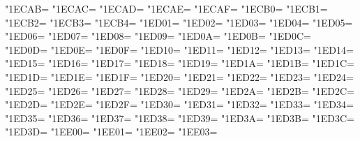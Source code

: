 \XeTeXcharclass"1ECAB=\KclassArabU
\XeTeXcharclass"1ECAC=\KclassArabU
\XeTeXcharclass"1ECAD=\KclassArabU
\XeTeXcharclass"1ECAE=\KclassArabU
\XeTeXcharclass"1ECAF=\KclassArabU
\XeTeXcharclass"1ECB0=\KclassArabU
\XeTeXcharclass"1ECB1=\KclassArabU
\XeTeXcharclass"1ECB2=\KclassArabU
\XeTeXcharclass"1ECB3=\KclassArabU
\XeTeXcharclass"1ECB4=\KclassArabU
\XeTeXcharclass"1ED01=\KclassArabU
\XeTeXcharclass"1ED02=\KclassArabU
\XeTeXcharclass"1ED03=\KclassArabU
\XeTeXcharclass"1ED04=\KclassArabU
\XeTeXcharclass"1ED05=\KclassArabU
\XeTeXcharclass"1ED06=\KclassArabU
\XeTeXcharclass"1ED07=\KclassArabU
\XeTeXcharclass"1ED08=\KclassArabU
\XeTeXcharclass"1ED09=\KclassArabU
\XeTeXcharclass"1ED0A=\KclassArabU
\XeTeXcharclass"1ED0B=\KclassArabU
\XeTeXcharclass"1ED0C=\KclassArabU
\XeTeXcharclass"1ED0D=\KclassArabU
\XeTeXcharclass"1ED0E=\KclassArabU
\XeTeXcharclass"1ED0F=\KclassArabU
\XeTeXcharclass"1ED10=\KclassArabU
\XeTeXcharclass"1ED11=\KclassArabU
\XeTeXcharclass"1ED12=\KclassArabU
\XeTeXcharclass"1ED13=\KclassArabU
\XeTeXcharclass"1ED14=\KclassArabU
\XeTeXcharclass"1ED15=\KclassArabU
\XeTeXcharclass"1ED16=\KclassArabU
\XeTeXcharclass"1ED17=\KclassArabU
\XeTeXcharclass"1ED18=\KclassArabU
\XeTeXcharclass"1ED19=\KclassArabU
\XeTeXcharclass"1ED1A=\KclassArabU
\XeTeXcharclass"1ED1B=\KclassArabU
\XeTeXcharclass"1ED1C=\KclassArabU
\XeTeXcharclass"1ED1D=\KclassArabU
\XeTeXcharclass"1ED1E=\KclassArabU
\XeTeXcharclass"1ED1F=\KclassArabU
\XeTeXcharclass"1ED20=\KclassArabU
\XeTeXcharclass"1ED21=\KclassArabU
\XeTeXcharclass"1ED22=\KclassArabU
\XeTeXcharclass"1ED23=\KclassArabU
\XeTeXcharclass"1ED24=\KclassArabU
\XeTeXcharclass"1ED25=\KclassArabU
\XeTeXcharclass"1ED26=\KclassArabU
\XeTeXcharclass"1ED27=\KclassArabU
\XeTeXcharclass"1ED28=\KclassArabU
\XeTeXcharclass"1ED29=\KclassArabU
\XeTeXcharclass"1ED2A=\KclassArabU
\XeTeXcharclass"1ED2B=\KclassArabU
\XeTeXcharclass"1ED2C=\KclassArabU
\XeTeXcharclass"1ED2D=\KclassArabU
\XeTeXcharclass"1ED2E=\KclassArabU
\XeTeXcharclass"1ED2F=\KclassArabU
\XeTeXcharclass"1ED30=\KclassArabU
\XeTeXcharclass"1ED31=\KclassArabU
\XeTeXcharclass"1ED32=\KclassArabU
\XeTeXcharclass"1ED33=\KclassArabU
\XeTeXcharclass"1ED34=\KclassArabU
\XeTeXcharclass"1ED35=\KclassArabU
\XeTeXcharclass"1ED36=\KclassArabU
\XeTeXcharclass"1ED37=\KclassArabU
\XeTeXcharclass"1ED38=\KclassArabU
\XeTeXcharclass"1ED39=\KclassArabU
\XeTeXcharclass"1ED3A=\KclassArabU
\XeTeXcharclass"1ED3B=\KclassArabU
\XeTeXcharclass"1ED3C=\KclassArabU
\XeTeXcharclass"1ED3D=\KclassArabU
\XeTeXcharclass"1EE00=\KclassArabU
\XeTeXcharclass"1EE01=\KclassArabU
\XeTeXcharclass"1EE02=\KclassArabU
\XeTeXcharclass"1EE03=\KclassArabU
